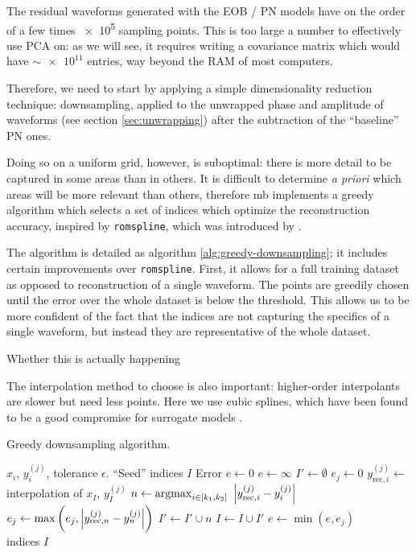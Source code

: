 \documentclass[main.tex]{subfiles}
\begin{document}
The residual waveforms generated with the \ac{EOB} / \ac{PN} models have on the order of a few times \num{e5} sampling points. 
This is too large a number to effectively use \ac{PCA} on: as we will see, it requires writing a covariance matrix which would have \(\sim \num{e11}\) entries, way beyond the \ac{RAM} of most computers. 

Therefore, we need to start by applying a simple dimensionality reduction technique: downsampling, applied to the unwrapped phase and amplitude of waveforms (see section \ref{sec:unwrapping}) after the subtraction of the ``baseline'' \ac{PN} ones.

Doing so on a uniform grid, however, is suboptimal: there is more detail to be captured in some areas than in others. 
It is difficult to determine \emph{a priori} which areas will be more relevant than others, therefore \ac{mb} implements a greedy algorithm which selects a set of indices which optimize the reconstruction accuracy, inspired by \texttt{romspline}, which was introduced by
\textcite{galleyFastEfficientEvaluation2016}. 

The algorithm is detailed as algorithm \ref{alg:greedy-downsampling}; it includes certain improvements over \texttt{romspline}. 
First, it allows for a full training dataset as opposed to reconstruction of a single waveform. The points are greedily chosen until the error over the whole dataset is below the threshold.
This allows us to be more confident of the fact that the indices are not capturing the specifics of a single waveform, but instead they are representative of the whole dataset.

Whether this is actually happening 

The interpolation method to choose is also important: higher-order interpolants are slower but need less points.
Here we use cubic splines, which have been found to be a good compromise for surrogate models \cite{lackeySurrogateModelAlignedspin2019}.


\begin{algorithm}
\caption{Greedy downsampling algorithm. }\label{alg:greedy-downsampling}
\begin{algorithmic}
\Require \(x_i\), \(y_i^{(j)}\), tolerance \(\epsilon \).
\Require ``Seed'' indices \(I\)
\State Error \(e \gets 0\)
\State \(e \gets \infty \)
\State \(I' \gets \emptyset\)
\State \( e_j \gets 0\)
\State \(y_{\text{rec}, i}^{(j)} \gets\) interpolation of \(x_I\), \(y_I^{(j)}\)
\State \(n \gets \operatorname{argmax}_{i \in [k_1 , k_2 ]} \ \abs{y _{\text{rec}, i}^{(j)} - y_{i}^{(j)}}\)
\State \(e_j \gets \max \left( e_j, \abs{y _{\text{rec}, n}^{(j)} - y_{n}^{(j)}}\right)\)
\State \(I' \gets I' \cup n\)
\EndIf
\State \(I \gets I \cup I'\)
\EndFor
\State \(e \gets \min (e, e_j)\)
\EndFor
\EndWhile \\
\Return indices \(I\)
\end{algorithmic}
\end{algorithm}
\end{document}
